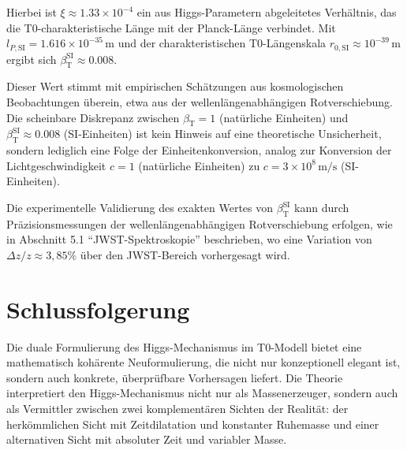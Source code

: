 \documentclass[a4paper,12pt]{article}
\newcommand{\betaT}{\beta_{\text{T}}}
\begin{document}
Hierbei ist \(\xi \approx 1.33 \times 10^{-4}\) ein aus Higgs-Parametern abgeleitetes Verhältnis, das die T0-charakteristische Länge mit der Planck-Länge verbindet. Mit \(l_{P,\text{SI}} = 1.616 \times 10^{-35} \, \text{m}\) und der charakteristischen T0-Längenskala \(r_{0,\text{SI}} \approx 10^{-39} \, \text{m}\) ergibt sich \(\betaT^{\text{SI}} \approx 0.008\).

Dieser Wert stimmt mit empirischen Schätzungen aus kosmologischen Beobachtungen überein, etwa aus der wellenlängenabhängigen Rotverschiebung. Die scheinbare Diskrepanz zwischen \(\betaT = 1\) (natürliche Einheiten) und \(\betaT^{\text{SI}} \approx 0.008\) (SI-Einheiten) ist kein Hinweis auf eine theoretische Unsicherheit, sondern lediglich eine Folge der Einheitenkonversion, analog zur Konversion der Lichtgeschwindigkeit \(c = 1\) (natürliche Einheiten) zu \(c = 3 \times 10^8 \, \text{m/s}\) (SI-Einheiten).

Die experimentelle Validierung des exakten Wertes von \(\betaT^{\text{SI}}\) kann durch Präzisionsmessungen der wellenlängenabhängigen Rotverschiebung erfolgen, wie in Abschnitt 5.1 ``JWST-Spektroskopie'' beschrieben, wo eine Variation von \(\Delta z / z \approx 3,85\%\) über den JWST-Bereich vorhergesagt wird.
	
	\section{Schlussfolgerung}
	Die duale Formulierung des Higgs-Mechanismus im T0-Modell bietet eine mathematisch kohärente Neuformulierung, die nicht nur konzeptionell elegant ist, sondern auch konkrete, überprüfbare Vorhersagen liefert. Die Theorie interpretiert den Higgs-Mechanismus nicht nur als Massenerzeuger, sondern auch als Vermittler zwischen zwei komplementären Sichten der Realität: der herkömmlichen Sicht mit Zeitdilatation und konstanter Ruhemasse und einer alternativen Sicht mit absoluter Zeit und variabler Masse.
	
\end{document}
